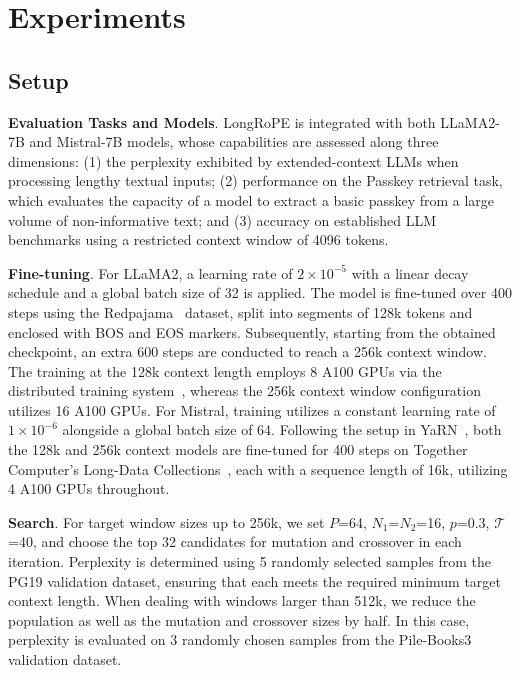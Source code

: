  \section{Experiments}

\label{sec:exp}
\subsection{Setup}
\textbf{Evaluation Tasks and Models}. LongRoPE is integrated with both LLaMA2-7B and Mistral-7B models, whose capabilities are assessed along three dimensions: (1) the perplexity exhibited by extended-context LLMs when processing lengthy textual inputs; (2) performance on the Passkey retrieval task, which evaluates the capacity of a model to extract a basic passkey from a large volume of non-informative text; and (3) accuracy on established LLM benchmarks using a restricted context window of 4096 tokens.

\textbf{Fine-tuning}. For LLaMA2, a learning rate of $2 \times 10^{-5}$ with a linear decay schedule and a global batch size of 32 is applied. The model is fine-tuned over 400 steps using the Redpajama~\cite{redpajama} dataset, split into segments of 128k tokens and enclosed with BOS and EOS markers. Subsequently, starting from the obtained checkpoint, an extra 600 steps are conducted to reach a 256k context window. The training at the 128k context length employs 8 A100 GPUs via the distributed training system~\cite{cube}, whereas the 256k context window configuration utilizes 16 A100 GPUs. For Mistral, training utilizes a constant learning rate of $1 \times 10^{-6}$ alongside a global batch size of 64. Following the setup in YaRN~\cite{yarn}, both the 128k and 256k context models are fine-tuned for 400 steps on Together Computer's Long-Data Collections~\cite{mistraldata}, each with a sequence length of 16k, utilizing 4 A100 GPUs throughout.

\textbf{Search}. For target window sizes up to 256k, we set $P$=64, $N_1$=$N_2$=16, $p$=0.3, $\mathcal{T}$=40, and choose the top 32 candidates for mutation and crossover in each iteration. Perplexity is determined using 5 randomly selected samples from the PG19 validation dataset, ensuring that each meets the required minimum target context length. When dealing with windows larger than 512k, we reduce the population as well as the mutation and crossover sizes by half. In this case, perplexity is evaluated on 3 randomly chosen samples from the Pile-Books3~\cite{pile} validation dataset.

